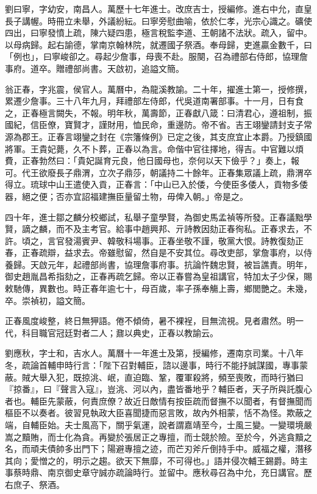 \begin{pinyinscope}
{劉曰寧，字幼安，南昌人。萬歷十七年進士。改庶吉士，授編修。進右中允，直皇長子講幄。時冊立未舉，外議紛紜。曰寧旁慰曲喻，依於仁孝，光宗心識之。礦使四出，曰寧發憤上疏，陳六疑四患，極言稅監李道、王朝諸不法狀。疏入，留中。以母病歸。起右諭德，掌南京翰林院，就遷國子祭酒。奉母歸，吏進贏金數千，曰「例也」，曰寧峻卻之。尋起少詹事，母喪不赴。服闋，召為禮部右侍郎，協理詹事府。道卒。贈禮部尚書。天啟初，追謚文簡。

翁正春，字兆震，侯官人。萬曆中，為龍溪教諭。二十年，擢進士第一，授修撰，累遷少詹事。三十八年九月，拜禮部左侍郎，代吳道南署部事。十一月，日有食之，正春極言闕失，不報。明年秋，萬壽節，正春獻八箴：曰清君心，遵祖制，振國紀，信臣僚，寶賢才，謹財用，恤民命，重邊防。帝不省。吉王翊鑾請封支子常源為郡王。正春言翊鑾之封在《宗籓條例》已定之後，其支庶宜止本爵。乃授鎮國將軍。王貴妃薨，久不卜葬，正春以為言。命偕中官往擇地，得吉。中官難以煩費，正春勃然曰：「貴妃誕育元良，他日國母也，奈何以天下儉乎？」奏上，報可。代王欲廢長子鼎渭，立次子鼎莎，朝議持二十餘年。正春集眾議上疏，鼎渭卒得立。琉球中山王遣使入貢，正春言：「中山已入於倭，今使臣多倭人，貢物多倭器，絕之便；否亦宜詔福建撫臣量留土物，毋俾入朝。」帝是之。

四十年，進士鄒之麟分校鄉試，私舉子童學賢，為御史馬孟禎等所發。正春議黜學賢，謫之麟，而不及主考官。給事中趙興邦、亓詩教因劾正春徇私。正春求去，不許。頃之，言官發湯賓尹、韓敬科場事。正春坐敬不謹，敬黨大恨。詩教復劾正春，正春疏辯，益求去。帝雖慰留，然自是不安其位。尋改吏部，掌詹事府，以侍養歸。天啟元年，起禮部尚書，協理詹事府事。抗論忤魏忠賢，被旨譙責。明年，御史趙胤昌希指劾之，正春再疏乞歸。帝以正春嘗為皇祖講官，特加太子少保，賜敕馳傳，異數也。時正春年逾七十，母百歲，率子孫奉觴上壽，鄉閭艷之。未幾，卒。崇禎初，謚文簡。

正春風度峻整，終日無狎語。倦不傾倚，暑不裸裎，目無流視。見者肅然。明一代，科目職官冠廷對者二人；鼐以典史，正春以教諭云。

劉應秋，字士和，吉水人。萬曆十一年進士及第，授編修，遷南京司業。十八年冬，疏論首輔申時行言：「陛下召對輔臣，諮以邊事，時行不能抒誠謀國，專事蒙蔽。賊大舉入犯，既掠洮、岷，直迫臨、鞏，覆軍殺將，頻至喪敗，而時行猶曰『掠番』，曰『聲言入寇』，豈洮、河以內，盡皆番地乎？輔臣者，天子所與託腹心者也。輔臣先蒙蔽，何責庶僚？故近日敵情有按臣疏而督撫不以聞者，有督撫聞而樞臣不以奏者。彼習見執政大臣喜聞捷而惡言敗，故內外相蒙，恬不為怪。欺蔽之端，自輔臣始。夫士風高下，關乎氣運，說者謂嘉靖至今，士風三變。一變環境嚴嵩之黷賄，而士化為貪。再變於張居正之專擅，而士競於險。至於今，外逃貪黷之名，而頑夫債帥多出門下；陽避專擅之迹，而芒刃斧斤倒持手中。威福之權，潛移其向；愛憎之的，明示之趨。欲天下無靡，不可得也。」語并侵次輔王錫爵。時主事蔡時鼎、南京御史章守誠亦疏論時行。並留中。應秋尋召為中允，充日講官。歷右庶子、祭酒。

}
\end{pinyinscope}
